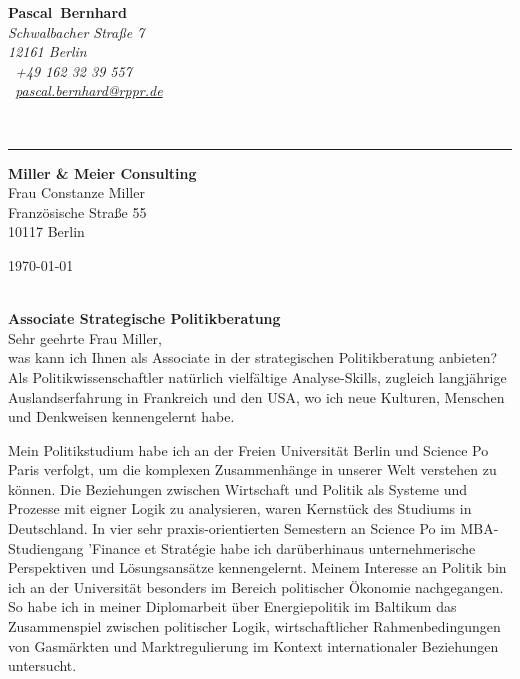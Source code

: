 \documentclass[11pt,a4paper]{article}
\def\firstname{Pascal}
\def\familyname{Bernhard}
\begin{document}
\sffamily   %
\hfill%
\begin{minipage}[t]{.6\textwidth}
	\raggedleft%
	{\bfseries {\color{firstnamecolor}\firstname}~{\color{familynamecolor}\familyname}}\\[.35ex]
	\small\itshape%
	Schwalbacher Straße 7\\
	12161 Berlin\\[.35ex]
	\Mobilefone~+49 162 32 39 557 \\
	\Letter~\href{mailto:pascal.bernhard@rppr.de}{pascal.bernhard@rppr.de}
\end{minipage}\\[0.5em]
%
{\color{firstnamecolor}\rule{\textwidth}{.25ex}}
%
\begin{minipage}[t]{.4\textwidth}
	\raggedright%
	\vspace*{1em}
	\textbf{Miller \& Meier Consulting} \\
	Frau Constanze Miller \\[.35ex]
	\small%
	Französische Straße 55\\
	10117 Berlin
\end{minipage}
%
\hfill
%
\begin{minipage}[t]{.4\textwidth}
	\raggedleft %
	\today
\end{minipage}\\[1em]


{\bfseries \color{familynamecolor}Associate Strategische Politikberatung}\\[0.75em]

Sehr geehrte Frau Miller,\\[0.5em]
%
was kann ich Ihnen als Associate in der strategischen Politikberatung anbieten? Als Politikwissenschaftler natürlich vielfältige Analyse-Skills, zugleich langjährige Auslandserfahrung in Frankreich und den USA, wo ich neue Kulturen, Menschen und Denkweisen kennengelernt habe.

Mein Politikstudium habe ich an der Freien Universität Berlin und Science Po Paris verfolgt, um die komplexen Zusammenhänge in unserer Welt verstehen zu können. Die Beziehungen zwischen Wirtschaft und Politik als Systeme und Prozesse mit eigner Logik zu analysieren, waren Kernstück des Studiums in Deutschland. In vier sehr praxis-orientierten Semestern an Science Po im MBA-Studiengang 'Finance et Strat\'{e}gie habe ich darüberhinaus unternehmerische Perspektiven und Lösungsansätze kennengelernt. Meinem Interesse an Politik bin ich an der Universität besonders im Bereich politischer Ökonomie nachgegangen. So habe ich in meiner Diplomarbeit über Energiepolitik im Baltikum das Zusammenspiel zwischen politischer Logik, wirtschaftlicher Rahmenbedingungen von Gasmärkten und Marktregulierung im Kontext internationaler Beziehungen untersucht.
\end{document}
